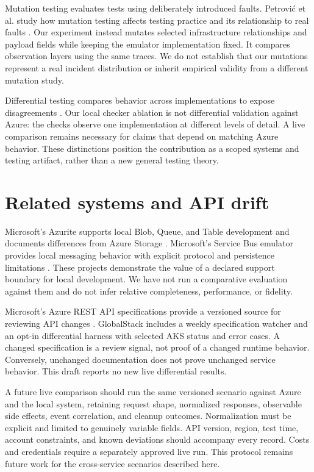 \documentclass[10pt,a4paper]{article}
\begin{document}
Mutation testing evaluates tests using deliberately introduced faults. Petrovi\'{c} et al. study how mutation testing affects testing practice and its relationship to real faults \cite{mutation}. Our experiment instead mutates selected infrastructure relationships and payload fields while keeping the emulator implementation fixed. It compares observation layers using the same traces. We do not establish that our mutations represent a real incident distribution or inherit empirical validity from a different mutation study.

Differential testing compares behavior across implementations to expose disagreements \cite{differential}. Our local checker ablation is not differential validation against Azure: the checks observe one implementation at different levels of detail. A live comparison remains necessary for claims that depend on matching Azure behavior. These distinctions position the contribution as a scoped systems and testing artifact, rather than a new general testing theory.

\section{Related systems and API drift}
Microsoft's Azurite supports local Blob, Queue, and Table development and documents differences from Azure Storage \cite{azurite}. Microsoft's Service Bus emulator provides local messaging behavior with explicit protocol and persistence limitations \cite{servicebus}. These projects demonstrate the value of a declared support boundary for local development. We have not run a comparative evaluation against them and do not infer relative completeness, performance, or fidelity.

Microsoft's Azure REST API specifications provide a versioned source for reviewing API changes \cite{specs}. GlobalStack includes a weekly specification watcher and an opt-in differential harness with selected AKS status and error cases. A changed specification is a review signal, not proof of a changed runtime behavior. Conversely, unchanged documentation does not prove unchanged service behavior. This draft reports no new live differential results.

A future live comparison should run the same versioned scenario against Azure and the local system, retaining request shape, normalized responses, observable side effects, event correlation, and cleanup outcomes. Normalization must be explicit and limited to genuinely variable fields. API version, region, test time, account constraints, and known deviations should accompany every record. Costs and credentials require a separately approved live run. This protocol remains future work for the cross-service scenarios described here.
\end{document}
